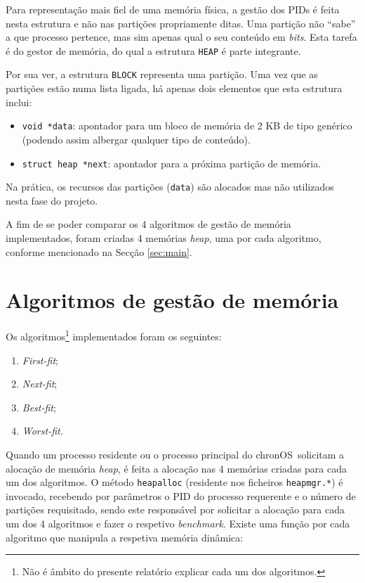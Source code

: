 \documentclass[10pt,oneside]{estiloUBI}
\newcommand{\chronOS}{\textsf{chronOS}}
\newcounter{note}
\begin{document}
	Para representação mais fiel de uma memória física, a gestão dos \ac{PID}s é feita nesta estrutura e não nas partições propriamente ditas. Uma partição não ``sabe'' a que processo pertence, mas sim apenas qual o seu conteúdo em \textit{bits}. Esta tarefa é do gestor de memória, do qual a estrutura \verb|HEAP| é parte integrante.
	
	Por sua ver, a estrutura \verb|BLOCK| representa uma partição. Uma vez que as partições estão numa lista ligada, há apenas dois elementos que esta estrutura inclui:
	
	\begin{itemize}
		\item \texttt{void *data}: apontador para um bloco de memória de 2 KB de tipo genérico (podendo assim albergar qualquer tipo de conteúdo).
		\item \texttt{struct heap *next}: apontador para a próxima partição de memória.
	\end{itemize}
	
	Na prática, os recursos das partições (\verb|data|) são alocados mas não utilizados nesta fase do projeto.
	
	A fim de se poder comparar os 4 algoritmos de gestão de memória implementados, foram criadas 4 memórias \textit{heap}, uma por cada algoritmo, conforme mencionado na Secção \ref{sec:main}.
	
	
	\section{Algoritmos de gestão de memória}
	\label{ssec:heap:algoithms}
	
	Os algoritmos\footnote{Não é âmbito do presente relatório explicar cada um dos algoritmos.} implementados foram os seguintes:
	
	\begin{enumerate}
		\item \textit{First-fit};
		\item \textit{Next-fit};
		\item \textit{Best-fit};
		\item \textit{Worst-fit}.
	\end{enumerate}

	Quando um processo residente ou o processo principal do \chronOS~solicitam a alocação de memória \textit{heap}, é feita a alocação nas 4 memórias criadas para cada um dos algoritmos. O método \verb|heapalloc| (residente nos ficheiros \verb|heapmgr.*|) é invocado, recebendo por parâmetros o PID do processo requerente e o número de partições requisitado, sendo este responsável por solicitar a alocação para cada um dos 4 algoritmos e fazer o respetivo \textit{benchmark}. Existe uma função por cada algoritmo que manipula a respetiva memória dinâmica:
	
\end{document}
